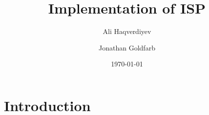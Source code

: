 \documentclass[letterpaper, 10pt, draft]{amsart}
\let\institute\address%
\theoremstyle{definition}
\theoremstyle{remark}
\begin{document}
\title{Implementation of ISP}
\author{Ali Haqverdiyev \and Jonathan Goldfarb}
\institute{Department of Mathematical Sciences\\Florida Institute of
    Technology\\Melbourne, FL 32901}
\date{\today}


\maketitle

\tableofcontents{}

\section{Introduction}\label{sec:introduction}
\end{document}
